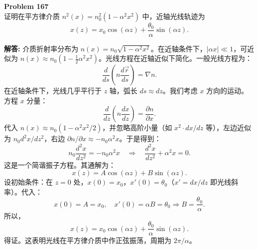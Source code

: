 \documentclass[12pt, a4paper, oneside]{ctexart}
\newenvironment{solution}{\par\noindent\textbf{解答:}\quad}{\par}
\begin{document}
\begin{mdframed}[backgroundcolor=gray!10, linewidth=0pt]
    \textbf{Problem 167} \\
    证明在平方律介质 $n^2(x) = n_0^2 (1 - \alpha^2 x^2)$ 中，近轴光线轨迹为
    \[
    x(z) = x_0 \cos(\alpha z) + \frac{\theta_0}{\alpha} \sin(\alpha z).
    \]
\end{mdframed}
\begin{solution}
    介质折射率分布为 $n(x) = n_0 \sqrt{1 - \alpha^2 x^2}$。在近轴条件下，$|\alpha x| \ll 1$，可近似为 $n(x) \approx n_0 (1 - \frac{1}{2} \alpha^2 x^2)$。光线方程在近轴近似下简化。一般光线方程为：
    \[
    \frac{d}{ds} \left( n \frac{d\vec{r}}{ds} \right) = \nabla n.
    \]
    在近轴条件下，光线几乎平行于 $z$ 轴，弧长 $ds \approx dz$。我们考虑 $x$ 方向的运动。方程 $x$ 分量：
    \[
    \frac{d}{dz} \left( n \frac{dx}{dz} \right) = \frac{\partial n}{\partial x}.
    \]
    代入 $n(x) \approx n_0 (1 - \alpha^2 x^2/2)$，并忽略高阶小量（如 $x^2 \cdot dx/dz$ 等），左边近似为 $n_0 d^2x/dz^2$，右边 $\partial n/\partial x \approx -n_0 \alpha^2 x$。于是得到：
    \[
    n_0 \frac{d^2 x}{dz^2} = -n_0 \alpha^2 x \quad \Rightarrow \quad \frac{d^2 x}{dz^2} + \alpha^2 x = 0.
    \]
    这是一个简谐振子方程。其通解为：
    \[
    x(z) = A \cos(\alpha z) + B \sin(\alpha z).
    \]
    设初始条件：在 $z=0$ 处，$x(0) = x_0$，$x'(0) = \theta_0$（$x' = dx/dz$ 即光线斜率）。代入：
    \[
    x(0) = A = x_0, \quad x'(0) = \alpha B = \theta_0 \Rightarrow B = \frac{\theta_0}{\alpha}.
    \]
    所以，
    \[
    x(z) = x_0 \cos(\alpha z) + \frac{\theta_0}{\alpha} \sin(\alpha z).
    \]
    得证。这表明光线在平方律介质中作正弦振荡，周期为 $2\pi/\alpha$。
\end{solution}
\end{document}
